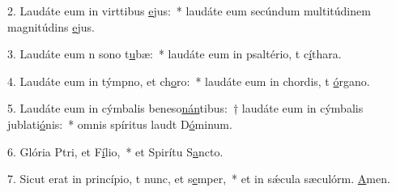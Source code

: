 2. Laudáte eum in virttibus \uline{e}jus:~* laudáte eum secúndum multitúdinem magnitúdins \uline{e}jus.\par 
3. Laudáte eum n sono t\uline{u}bæ:~* laudáte eum in psaltério, t c\uline{í}thara.\par 
4. Laudáte eum in týmpno, et ch\uline{o}ro:~* laudáte eum in chordis, t \uline{ó}rgano.\par 
5. Laudáte eum in cýmbalis beneso\uline{nán}tibus:~† laudáte eum in cýmbalis jublati\uline{ó}nis:~* omnis spíritus laudt D\uline{ó}minum.\par 
6. Glória Ptri, et F\uline{í}lio,~* et Spirítu S\uline{a}ncto.\par 
7. Sicut erat in princípio, t nunc, et s\uline{e}mper,~* et in sǽcula sæculórm. \uline{A}men.\par 
